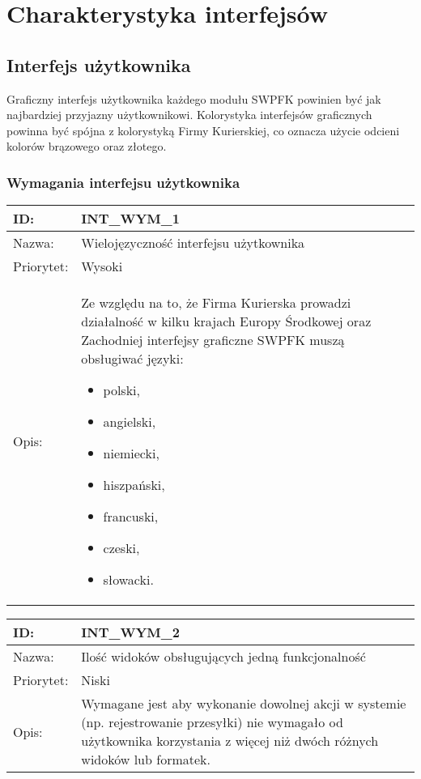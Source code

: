 \section{Charakterystyka interfejsów}

\subsection{Interfejs użytkownika}
Graficzny interfejs użytkownika każdego modułu SWPFK powinien być jak najbardziej przyjazny użytkownikowi. Kolorystyka interfejsów graficznych powinna być spójna z kolorystyką Firmy Kurierskiej, co oznacza użycie odcieni kolorów brązowego oraz złotego.

\subsubsection{Wymagania interfejsu użytkownika}
\begin{center}
\begin{tabular}[h]{|p{1.6cm}|p{13.5cm}|}
\hline
ID: & INT\_WYM\_1 \\ \hline
Nazwa: & Wielojęzyczność interfejsu użytkownika \\ \hline
Priorytet: & Wysoki \\ \hline
Opis: & Ze względu na to, że Firma Kurierska prowadzi działalność w kilku krajach Europy Środkowej oraz Zachodniej interfejsy graficzne SWPFK muszą obsługiwać języki:
\begin{itemize}
\item polski,
\item angielski,
\item niemiecki,
\item hiszpański,
\item francuski,
\item czeski,
\item słowacki.
\end{itemize} \\
\hline
\end{tabular}
\end{center}

\begin{center}
\begin{tabular}[h]{|p{1.6cm}|p{13.5cm}|}
\hline
ID: & INT\_WYM\_2 \\ \hline
Nazwa: & Ilość widoków obsługujących jedną funkcjonalność \\ \hline
Priorytet: & Niski \\ \hline
Opis: & Wymagane jest aby wykonanie dowolnej akcji w systemie (np. rejestrowanie przesyłki) nie wymagało od użytkownika korzystania z więcej niż dwóch różnych widoków lub formatek. \\
\hline
\end{tabular}
\end{center}

